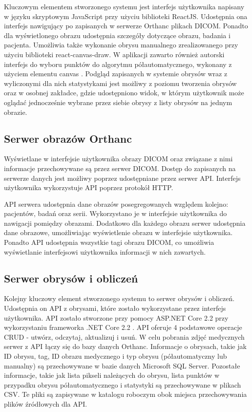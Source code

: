 \documentclass[a4paper,11pt,twoside,openright]{report}
\theoremstyle{definition}
\begin{document}
Kluczowym elementem stworzonego systemu jest interfejs użytkownika napisany w języku skryptowym JavaScript przy użyciu biblioteki ReactJS. Udostępnia ona interfejs nawigujący po zapisanych w serwerze Orthanc plikach DICOM. Ponadto dla wyświetlonego obrazu udostępnia szczegóły dotyczące obrazu, badania i pacjenta. Umożliwia także wykonanie obrysu manualnego zrealizowanego przy użyciu biblioteki react-canvas-draw. W aplikacji zawarto również autorski interfejs do wyboru punktów do algorytmu półautomatycznego, wykonany z użyciem elementu canvas \cite{Canvas}. Podgląd zapisanych w systemie obrysów wraz z wyliczonymi dla nich statystykami jest możliwy z poziomu tworzenia obrysów oraz w osobnej zakładce, gdzie udostępniono widok, w którym użytkownik może oglądać jednocześnie wybrane przez siebie obrysy z listy obrysów na jednym obrazie.

\subsection {Serwer obrazów Orthanc}

Wyświetlane w interfejsie użytkownika obrazy DICOM oraz związane z nimi informacje przechowywane są przez serwer DICOM. Dostęp do zapisanych na serwerze danych jest możliwy poprzez udostępniane przez serwer API. Interfejs użytkownika wykorzystuje API poprzez protokół HTTP.

API serwera udostępnia dane obrazów posegregowanych względem kolejno: pacjentów, badań oraz serii. Wykorzystano je w interfejsie użytkownika do nawigacji pomiędzy obrazami. Dodatkowo dla każdego obrazu serwer udostępnia dane obrazowe, umożliwiając wyświetlenie obrazu w interfejsie użytkownika. Ponadto API udostępnia wszystkie tagi obrazu DICOM, co umożliwia wyświetlanie interfejsowi użytkownika informacji w nich zawartych.

\subsection {Serwer obrysów i obliczeń}
Kolejny kluczowy element stworzonego systemu to serwer obrysów i obliczeń. Udostępnia on API z obrysami, które zostało wykorzystane przez interfejs użytkownika. API zostało stworzone przy pomocy ASP.NET Core 2.2 \cite{ASPNET} przy wykorzystaniu frameworka .NET Core 2.2 \cite{Charakterystyka dotnet}. API oferuje 4 podstawowe operacje CRUD - utwórz, odczytaj, aktualizuj i usuń. W celu pobrania zdjęć medycznych serwer z API łączy się do bazy danych Orthanc. Informacje o obrysach, takie jak ID obrysu, tag, ID obrazu medycznego i typ obrysu (półautomatyczny lub manualny) są przechowywane w bazie danych Microsoft SQL Server. Pozostałe informacje, takie jak lista pikseli należących do obrysu, lista punktów w przypadku obrysu półautomatycznego i statystyki są przechowywane w plikach CSV. Te pliki są zapisywane w katalogu roboczym obok miejsca przechowywania plików źródłowych dla API.
\end{document}
